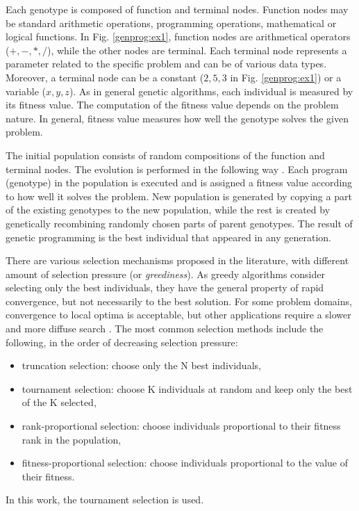 Each genotype is composed of function and terminal nodes.
Function nodes may be standard arithmetic operations, programming operations, mathematical or logical functions.
In Fig. \ref{genprog:ex1}, function nodes are arithmetical operators ($+, -, *, /$), while the other nodes are terminal.
Each terminal node represents a parameter related to the specific problem and can be of various data types.
Moreover, a terminal node can be a constant ($2, 5, 3$ in Fig. \ref{genprog:ex1}) or a variable ($x, y, z$).
As in general genetic algorithms, each individual is measured by its fitness value.
The computation of the fitness value depends on the problem nature.
In general, fitness value measures how well the genotype solves the given problem.

The initial population consists of random compositions of the function and terminal nodes.
The evolution is performed in the following way \cite{koza1992genetic}.
Each program (genotype) in the population is executed and is assigned a fitness value according to how well it solves the problem.
New population is generated by copying a part of the existing genotypes to the new population, while the rest is created by genetically recombining randomly chosen parts of parent genotypes.
The result of genetic programming is the best individual that appeared in any generation.

There are various selection mechanisms proposed in the literature, with different amount of selection pressure (or \textit{greediness}).
As greedy algorithms consider selecting only the best individuals, they have the general property of rapid convergence, but not necessarily to the best solution.
For some problem domains, convergence to local optima is acceptable, but other applications require a slower and more diffuse search \cite{rozenberg2012handbook}.
The most common selection methods include the following, in the order of decreasing selection pressure:
\begin{itemize}
	\item truncation selection: choose only the N best individuals,
	\item tournament selection: choose K individuals at random and keep only the best of the K selected,
	\item rank-proportional selection: choose individuals proportional to their fitness rank in the population,
	\item fitness-proportional selection: choose individuals proportional to the value of their fitness.
\end{itemize}
In this work, the tournament selection is used.

